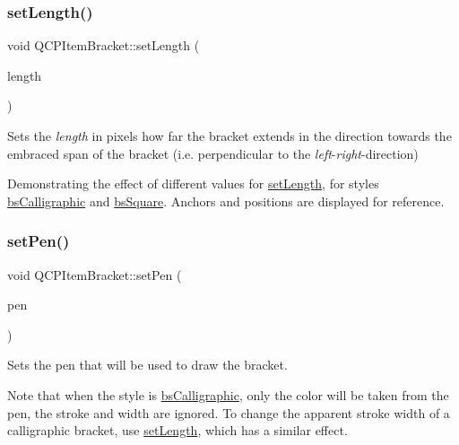 \mbox{\label{class_q_c_p_item_bracket_ac7cfc3da7da9b5c5ac5dfbe4f0351b2a}} 
\subsubsection{\texorpdfstring{set\+Length()}{setLength()}}
{\footnotesize\ttfamily void Q\+C\+P\+Item\+Bracket\+::set\+Length (\begin{DoxyParamCaption}\item[{double}]{length }\end{DoxyParamCaption})}

Sets the {\itshape length} in pixels how far the bracket extends in the direction towards the embraced span of the bracket (i.\+e. perpendicular to the {\itshape left}-\/{\itshape right}-\/direction)

 \begin{center}Demonstrating the effect of different values for \mbox{\hyperlink{class_q_c_p_item_bracket_ac7cfc3da7da9b5c5ac5dfbe4f0351b2a}{set\+Length}}, for styles \mbox{\hyperlink{class_q_c_p_item_bracket_a7ac3afd0b24a607054e7212047d59dbda8f29f5ef754e2dc9a9efdedb2face0f3}{bs\+Calligraphic}} and \mbox{\hyperlink{class_q_c_p_item_bracket_a7ac3afd0b24a607054e7212047d59dbda7f9df4a7359bfe3dac1dbe4ccf5d220c}{bs\+Square}}. Anchors and positions are displayed for reference.\end{center}  \mbox{\label{class_q_c_p_item_bracket_ab13001d9cc5d8f9e56ea15bdda682acb}} 
\subsubsection{\texorpdfstring{set\+Pen()}{setPen()}}
{\footnotesize\ttfamily void Q\+C\+P\+Item\+Bracket\+::set\+Pen (\begin{DoxyParamCaption}\item[{const Q\+Pen \&}]{pen }\end{DoxyParamCaption})}

Sets the pen that will be used to draw the bracket.

Note that when the style is \mbox{\hyperlink{class_q_c_p_item_bracket_a7ac3afd0b24a607054e7212047d59dbda8f29f5ef754e2dc9a9efdedb2face0f3}{bs\+Calligraphic}}, only the color will be taken from the pen, the stroke and width are ignored. To change the apparent stroke width of a calligraphic bracket, use \mbox{\hyperlink{class_q_c_p_item_bracket_ac7cfc3da7da9b5c5ac5dfbe4f0351b2a}{set\+Length}}, which has a similar effect.

